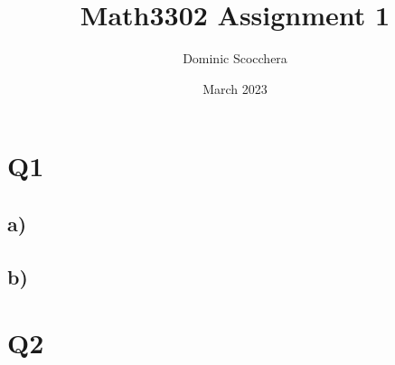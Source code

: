 \documentclass{article}
\title{Math3302 Assignment 1}
\author{Dominic Scocchera}
\date{March 2023}
\begin{document}
\maketitle
\section*{Q1}
\subsection*{a)}
\subsection*{b)}
\section*{Q2}
\end{document}
